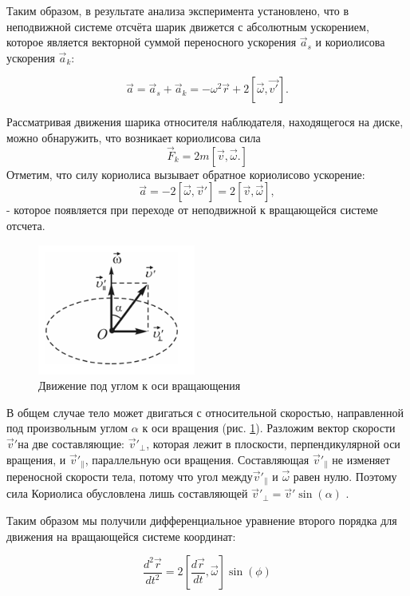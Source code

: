 Таким образом, в результате анализа эксперимента установлено, что в неподвижной системе отсчёта шарик движется с абсолютным ускорением, которое является векторной суммой переносного ускорения \(\vec{a}_s\) и кориолисова ускорения \(\vec{a}_k\):

\[
\vec{a} = \vec{a}_s + \vec{a}_k = -\omega^2 \vec{r} + 2 [\vec{\omega}, \vec{v'}].
\]

Рассматривая движения шарика относителя наблюдателя, находящегося на диске, можно обнаружить, что возникает кориолисова сила 
\begin{equation}
	\vec{F}_k = 2m[\vec{v}, \vec{\omega}.]
\end{equation}
Отметим, что силу кориолиса вызывает обратное кориолисово ускорение:
\[
	\vec{a} = -2[\vec{\omega}, \vec{v}'] = 2[\vec{v}, \vec{\omega}],
\]
- которое появляется при переходе от неподвижной к
вращающейся системе отсчета.

\begin{figure}[h]  %
	\centering
	\includegraphics[height=0.3\textwidth]{imgs/earth.png}  %
	\caption{Движение под углом к оси вращающения}  %
	\label{fig:earth}  %
\end{figure}

В общем случае тело может двигаться с относительной скоростью,
направленной под произвольным углом $\alpha$ к оси вращения (рис. \ref{fig:earth}). Разложим
вектор скорости  $\vec{v}' $на две составляющие: $\vec{v}'_\perp$, которая лежит в плоскости,
перпендикулярной оси вращения, и $\vec{v}'_{\parallel}$, параллельную оси вращения.
Составляющая $\vec{v}'_{\parallel}$ не изменяет переносной скорости тела, потому что угол между$\vec{v}'_{\parallel}$ и $\vec{\omega}$ равен нулю. Поэтому сила Кориолиса обусловлена лишь составляющей $\vec{v}'_\perp = \vec{v}'\sin(\alpha)$ .

Таким образом мы получили дифференциальное уравнение второго порядка для движения на вращающейся системе координат:

\begin{equation}
	\frac{d^2\vec{r}}{dt^2} = 2\left[\frac{d\vec{r}}{dt}, \vec{\omega}\right]\sin(\phi)
	\label{eq:difr}
\end{equation}

